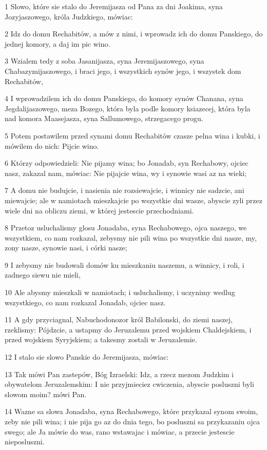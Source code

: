 \par 1 Slowo, które sie stalo do Jeremijasza od Pana za dni Joakima, syna Jozyjaszowego, króla Judzkiego, mówiac:
\par 2 Idz do domu Rechabitów, a mów z nimi, i wprowadz ich do domu Panskiego, do jednej komory, a daj im pic wino.
\par 3 Wzialem tedy z soba Jasanijasza, syna Jeremijaszowego, syna Chabazymijaszowego, i braci jego, i wszystkich synów jego, i wszystek dom Rechabitów,
\par 4 I wprowadzilem ich do domu Panskiego, do komory synów Chanana, syna Jegdalijaszowego, meza Bozego, która byla podle komory ksiazecej, która byla nad komora Maasejasza, syna Sallumowego, strzegacego progu.
\par 5 Potem postawilem przed synami domu Rechabitów czasze pelna wina i kubki, i mówilem do nich: Pijcie wino.
\par 6 Którzy odpowiedzieli: Nie pijamy wina; bo Jonadab, syn Rechabowy, ojciec nasz, zakazal nam, mówiac: Nie pijajcie wina, wy i synowie wasi az na wieki;
\par 7 A domu nie budujcie, i nasienia nie rozsiewajcie, i winnicy nie sadzcie, ani miewajcie; ale w namiotach mieszkajcie po wszystkie dni wasze, abyscie zyli przez wiele dni na obliczu ziemi, w której jestescie przechodniami.
\par 8 Przetoz usluchalismy glosu Jonadaba, syna Rechabowego, ojca naszego, we wszystkiem, co nam rozkazal, zebysmy nie pili wina po wszystkie dni nasze, my, zony nasze, synowie nasi, i córki nasze;
\par 9 I zebysmy nie budowali domów ku mieszkaniu naszemu, a winnicy, i roli, i zadnego siewu nie mieli,
\par 10 Ale abysmy mieszkali w namiotach; i usluchalismy, i uczynimy wedlug wszystkiego, co nam rozkazal Jonadab, ojciec nasz.
\par 11 A gdy przyciagnal, Nabuchodonozor król Babilonski, do ziemi naszej, rzeklismy: Pójdzcie, a ustapmy do Jeruzalemu przed wojskiem Chaldejskiem, i przed wojskiem Syryjskiem; a takesmy zostali w Jeruzalemie.
\par 12 I stalo sie slowo Panskie do Jeremijasza, mówiac:
\par 13 Tak mówi Pan zastepów, Bóg Izraelski: Idz, a rzecz mezom Judzkim i obywatelom Jeruzalemskim: I nie przyjmieciez cwiczenia, abyscie posluszni byli slowom moim? mówi Pan.
\par 14 Wazne sa slowa Jonadaba, syna Rechabowego, które przykazal synom swoim, zeby nie pili wina; i nie pija go az do dnia tego, bo posluszni sa przykazaniu ojca swego; ale Ja mówie do was, rano wstawajac i mówiac, a przecie jestescie nieposluszni.
